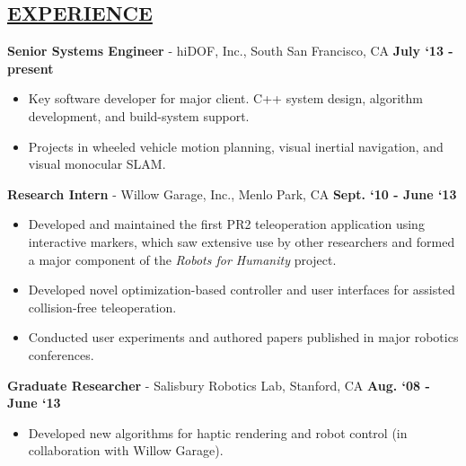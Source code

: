 \documentclass[line,margin]{res}
\newenvironment{compactlist}{
	\begin{itemize}\itemsep=0pt
}{
	\end{itemize}
}
\begin{document}

\address{469 Homer Ave, Palo Alto, CA 94301}
\address{650.762.6844}
\address{adamleeper@gmail.com}
\address{adamleeper.com $\mid$ github.com/aleeper}


\begin{resume}
%
\section{\underline{EXPERIENCE}}
\vspace{1.0pc}
{\bf Senior Systems Engineer} - hiDOF, Inc., South San Francisco, CA  \hfill \textbf{July `13 - present}
\begin{compactlist}
\item Key software developer for major client. C++ system design, algorithm development, and build-system support.
\item Projects in wheeled vehicle motion planning, visual inertial navigation, and visual monocular SLAM.
\end{compactlist}
%
{\bf Research Intern} - Willow Garage, Inc., Menlo Park, CA \hfill \textbf{Sept. `10 - June `13}
\begin{compactlist}
\item Developed and maintained the first PR2 teleoperation application using interactive markers,
which saw extensive use by other researchers and formed a major component of the \textit{Robots for Humanity} project.
\item Developed novel optimization-based controller and user interfaces for assisted collision-free teleoperation.
\item Conducted user experiments and authored papers published in major robotics conferences.
\end{compactlist}
%
{\bf Graduate Researcher} - Salisbury Robotics Lab, Stanford, CA \hfill \textbf{Aug. `08 - June `13}
\begin{compactlist}
\item Developed new algorithms for haptic rendering and robot control (in collaboration with Willow Garage).

\end{compactlist}
\end{resume}
\end{document}

